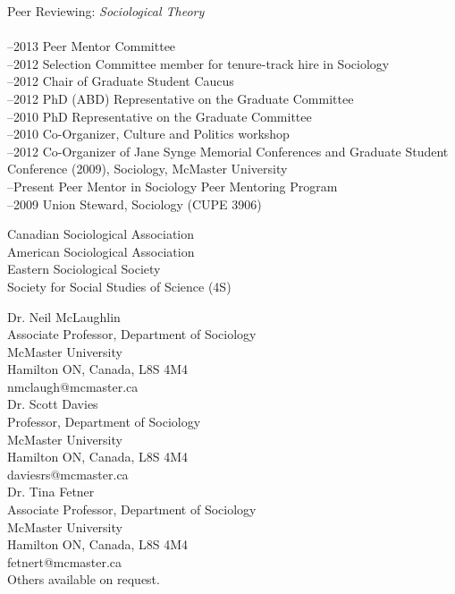 \documentclass[11pt,usenames,dvipsnames]{article}
\begin{document}


\noindent Peer Reviewing: {\it Sociological Theory}\\

\\
–2013 Peer Mentor Committee\\
–2012 Selection Committee member for tenure-track hire in Sociology\\
–2012 Chair of Graduate Student Caucus\\
–2012 PhD (ABD) Representative on the Graduate Committee\\
–2010 PhD Representative on the Graduate Committee\\
–2010 Co-Organizer, Culture and Politics workshop\\
–2012 Co-Organizer of Jane Synge Memorial Conferences and Graduate Student Conference (2009), Sociology, McMaster University\\
–Present Peer Mentor in Sociology Peer Mentoring Program\\
–2009 Union Steward, Sociology (CUPE 3906)\\



\noindent Canadian Sociological Association\\
\noindent American Sociological Association \\
\noindent Eastern Sociological Society\\
\noindent Society for Social Studies of Science (4S)\\




\noindent Dr. Neil McLaughlin\\
Associate Professor, Department of Sociology\\
McMaster University\\
Hamilton ON, Canada, L8S 4M4\\
nmclaugh@mcmaster.ca\\

\noindent Dr. Scott Davies\\
Professor, Department of Sociology\\
McMaster University\\
Hamilton ON, Canada, L8S 4M4\\
daviesrs@mcmaster.ca\\

\noindent Dr. Tina Fetner\\
Associate Professor, Department of Sociology\\
McMaster University\\
Hamilton ON, Canada, L8S 4M4\\
fetnert@mcmaster.ca\\

\noindent Others available on request.\\
\end{document}
